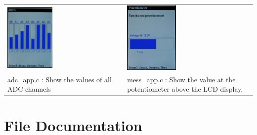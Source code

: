 \begin{tabular}{ p{8cm}  p{8cm} }
  \includegraphics[width=0.4\textwidth]{adcs.jpg} & \includegraphics[width=0.4\textwidth]{potent.jpg}\\
   adc\_app.c : Show the values of all ADC channels & mess\_app.c : Show the value at the potentiometer above the LCD display. \\
\end{tabular}


\newpage
\section{\-File \-Documentation}



